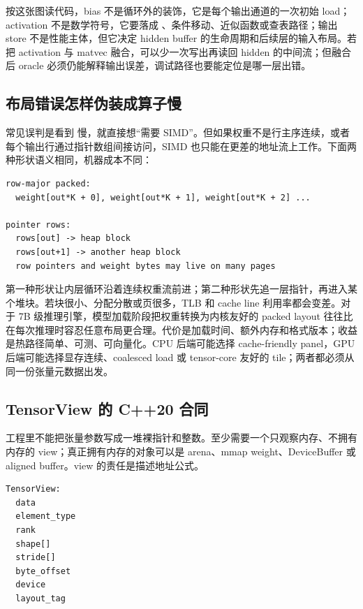 按这张图读代码，bias 不是循环外的装饰，它是每个输出通道的一次初始 load；activation 不是数学符号，它要落成 、条件移动、近似函数或查表路径；输出 store 不是性能主体，但它决定 hidden buffer 的生命周期和后续层的输入布局。若把 activation 与 matvec 融合，可以少一次写出再读回 hidden 的中间流；但融合后 oracle 必须仍能解释输出误差，调试路径也要能定位是哪一层出错。

\subsection{布局错误怎样伪装成算子慢}

常见误判是看到  慢，就直接想“需要 SIMD”。但如果权重不是行主序连续，或者每个输出行通过指针数组间接访问，SIMD 也只能在更差的地址流上工作。下面两种形状语义相同，机器成本不同：

\begin{lstlisting}[numbers=none,caption={两种语义相同但地址形状不同的权重访问}]
row-major packed:
  weight[out*K + 0], weight[out*K + 1], weight[out*K + 2] ...

pointer rows:
  rows[out] -> heap block
  rows[out+1] -> another heap block
  row pointers and weight bytes may live on many pages
\end{lstlisting}

第一种形状让内层循环沿着连续权重流前进；第二种形状先追一层指针，再进入某个堆块。若块很小、分配分散或页很多，TLB 和 cache line 利用率都会变差。对于 7B 级推理引擎，模型加载阶段把权重转换为内核友好的 packed layout 往往比在每次推理时容忍任意布局更合理。代价是加载时间、额外内存和格式版本；收益是热路径简单、可测、可向量化。CPU 后端可能选择 cache-friendly panel，GPU 后端可能选择显存连续、coalesced load 或 tensor-core 友好的 tile；两者都必须从同一份张量元数据出发。

\subsection{TensorView 的 C++20 合同}

工程里不能把张量参数写成一堆裸指针和整数。至少需要一个只观察内存、不拥有内存的 view；真正拥有内存的对象可以是 arena、mmap weight、DeviceBuffer 或 aligned buffer。view 的责任是描述地址公式。

\begin{lstlisting}[numbers=none,caption={TensorView 的最小字段}]
TensorView:
  data
  element_type
  rank
  shape[]
  stride[]
  byte_offset
  device
  layout_tag
\end{lstlisting}

